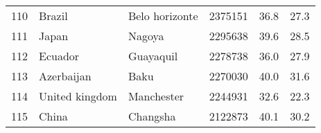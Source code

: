 \begin{center}
\begin{longtable}{clllcc}
 110 &              Brazil &  Belo horizonte &    2375151 &     36.8 &     27.3 \\
 111 &               Japan &          Nagoya &    2295638 &     39.6 &     28.5 \\
 112 &             Ecuador &       Guayaquil &    2278738 &     36.0 &     27.9 \\
 113 &          Azerbaijan &            Baku &    2270030 &     40.0 &     31.6 \\
 114 &      United kingdom &      Manchester &    2244931 &     32.6 &     22.3 \\
 115 &               China &        Changsha &    2122873 &     40.1 &     30.2 \\
    \end{longtable}
\end{center}
